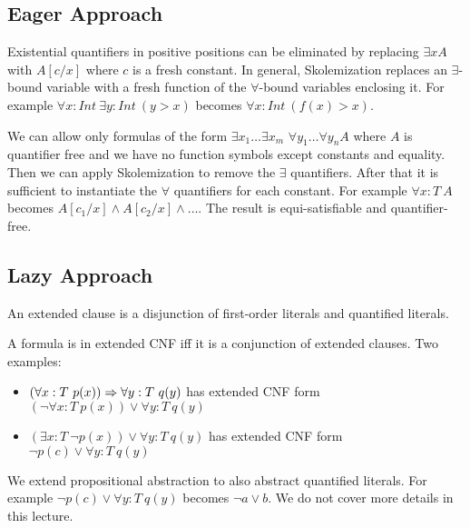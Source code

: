 \subsection{Eager Approach}
\begin{mytitle}[Skolemization] Existential quantifiers in positive positions can be eliminated by replacing $\exists x A$ with $A[c/x]$ where $c$ is a fresh constant. In general, Skolemization replaces an $\exists$-bound variable with a fresh function of the $\forall$-bound variables enclosing it. For example $\forall x: Int\ \exists y: Int\ (y > x)$ becomes $\forall x: Int\ (f(x) > x)$.
\end{mytitle}
\begin{mytitle} We can allow only formulas of the form $\exists x_1\ldots \exists x_m$ $\forall y_1 \ldots \forall y_n A$ where $A$ is quantifier free and we have no function symbols except constants and equality. Then we can apply Skolemization to remove the $\exists$ quantifiers. After that it is sufficient to instantiate the $\forall$ quantifiers for each constant. For example $\forall x: T\ A$ becomes $A[c_1/x]\land A[c_2/x]\land \ldots$. The result is equi-satisfiable and quantifier-free.
\end{mytitle}

\subsection{Lazy Approach}
\begin{mytitle} An extended clause is a disjunction of first-order literals and quantified literals.
\end{mytitle}
\begin{mytitle} A formula is in extended CNF iff it is a conjunction of extended clauses. Two examples:
\begin{itemize}
    \item $(\forall x:T\ p(x))\To \forall y:T\ q(y)$ has extended CNF form $(\lnot \forall x:T\ p(x))\lor\forall y:T\ q(y)$
    \item $(\exists x:T\ \lnot p(x)) \lor \forall y:T\ q(y)$ has extended CNF form $\lnot p(c)\lor \forall y:T\ q(y)$
\end{itemize}
\end{mytitle}
\begin{mytitle} We extend propositional abstraction to also abstract quantified literals. For example $\lnot p(c) \lor \forall y:T\ q(y)$ becomes $\lnot a \lor b$. We do not cover more details in this lecture.
\end{mytitle}

